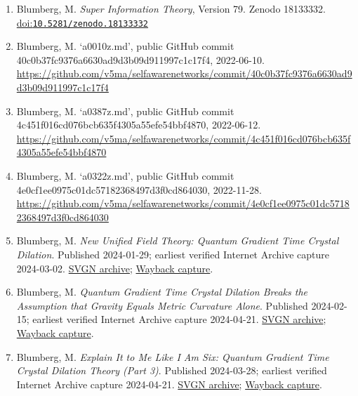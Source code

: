 \documentclass[
  american,
  11pt,
  letterpaper,
]{article}
\providecommand{\tightlist}{%
  \setlength{\itemsep}{0pt}\setlength{\parskip}{0pt}}
\begin{document}
\begin{enumerate}
\def\labelenumi{\arabic{enumi}.}
\tightlist
\item
  Blumberg, M. \emph{Super Information Theory}, Version 79. Zenodo 18133332. \href{https://doi.org/10.5281/zenodo.18133332}{doi:\nolinkurl{10.5281/zenodo.18133332}}
\item
  Blumberg, M. `a0010z.md', public GitHub commit 40c0b37f\allowbreak{}c9376a66\allowbreak{}30ad9d3b\allowbreak{}09d91199\allowbreak{}7c1c17f4, 2022-06-10. \url{https://github.com/v5ma/selfawarenetworks/commit/40c0b37fc9376a6630ad9d3b09d911997c1c17f4}
\item
  Blumberg, M. `a0387z.md', public GitHub commit 4c451f01\allowbreak{}6cd076bc\allowbreak{}b635f430\allowbreak{}5a55efe5\allowbreak{}4bbf4870, 2022-06-12. \url{https://github.com/v5ma/selfawarenetworks/commit/4c451f016cd076bcb635f4305a55efe54bbf4870}
\item
  Blumberg, M. `a0322z.md', public GitHub commit 4e0cf1ee\allowbreak{}0975c01d\allowbreak{}c5718236\allowbreak{}8497d3f0\allowbreak{}cd864030, 2022-11-28. \url{https://github.com/v5ma/selfawarenetworks/commit/4e0cf1ee0975c01dc57182368497d3f0cd864030}
\item
  Blumberg, M. \emph{New Unified Field Theory: Quantum Gradient Time Crystal Dilation}. Published 2024-01-29; earliest verified Internet Archive capture 2024-03-02. \href{https://svgn.io/wiki/svgn/articles/2024-01-29-new-unified-field-theory-quantum-gradient-time-crystal-dilation-explains-quantum-mass--svgn-141137741.html}{SVGN archive}; \href{https://web.archive.org/web/20240302110649/https://www.svgn.io/p/a-new-unified-field-theory-called}{Wayback capture}.
\item
  Blumberg, M. \emph{Quantum Gradient Time Crystal Dilation Breaks the Assumption that Gravity Equals Metric Curvature Alone}. Published 2024-02-15; earliest verified Internet Archive capture 2024-04-21. \href{https://svgn.io/wiki/svgn/articles/2024-02-15-quantum-gradient-time-crystal-dilation-breaks-the-assumption-that-gravity-equals-metri-svgn-141688745.html}{SVGN archive}; \href{https://web.archive.org/web/20240421105331/https://www.svgn.io/p/quantum-gradient-time-crystal-dilation}{Wayback capture}.
\item
  Blumberg, M. \emph{Explain It to Me Like I Am Six: Quantum Gradient Time Crystal Dilation Theory (Part 3)}. Published 2024-03-28; earliest verified Internet Archive capture 2024-04-21. \href{https://svgn.io/wiki/svgn/articles/2024-03-28-explain-it-to-me-like-i-am-six-quantum-gradient-time-crystal-dilation-theory-part-3-svgn-143030330.html}{SVGN archive}; \href{https://web.archive.org/web/20240421111934/https://www.svgn.io/p/explain-it-to-me-like-i-am-six-quantum}{Wayback capture}.

\end{enumerate}
\end{document}
